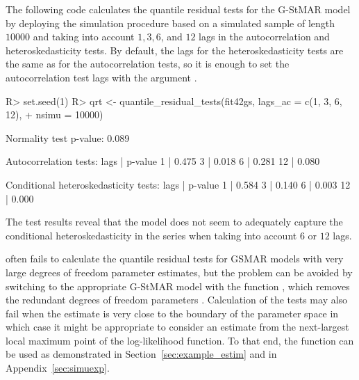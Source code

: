 \documentclass[nojss]{jss} %
\begin{document}
The following code calculates the quantile residual tests for the G-StMAR model  by deploying the simulation procedure based on a simulated sample of length $10000$ and taking into account $1,3,6$, and $12$ lags in the autocorrelation and heteroskedasticity tests. By default, the lags for the heteroskedasticity tests are the same as for the autocorrelation tests, so it is enough to set the autocorrelation test lags with the argument .
%
\begin{CodeChunk}
\begin{CodeInput}
R> set.seed(1)
R> qrt <- quantile_residual_tests(fit42gs, lags_ac = c(1, 3, 6, 12),
+    nsimu = 10000)
\end{CodeInput}
\begin{CodeOutput}
Normality test p-value: 0.089

Autocorrelation tests:
lags | p-value
  1  |  0.475
  3  |  0.018
  6  |  0.281
  12 |  0.080

Conditional heteroskedasticity tests:
lags | p-value
  1  |  0.584
  3  |  0.140
  6  |  0.003
  12 |  0.000
\end{CodeOutput}
\end{CodeChunk}
%
The test results reveal that the model does not seem to adequately capture the conditional heteroskedasticity in the series when taking into account $6$ or $12$ lags.

 often fails to calculate the quantile residual tests for GSMAR models with very large degrees of freedom parameter estimates, but the problem can be avoided by switching to the appropriate G-StMAR model with the function , which removes the redundant degrees of freedom parameters \citep[see][Section 4, and Section~\ref{sec:example_estim} of this paper]{Virolainen:2020}. Calculation of the tests may also fail when the estimate is very close to the boundary of the parameter space in which case it might be appropriate to consider an estimate from the next-largest local maximum point of the log-likelihood function. To that end, the function  can be used as demonstrated in Section~\ref{sec:example_estim} and in Appendix~\ref{sec:simuexp}.
\end{document}
